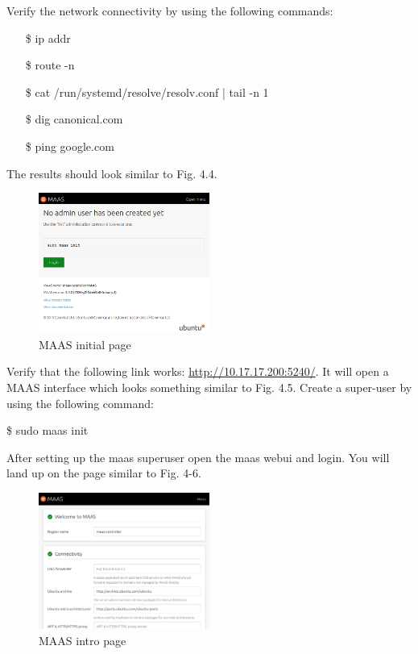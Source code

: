 Verify the network connectivity by using the following commands:

\begin{itemize}
    \setlength\itemsep{-1em}
    \item[\$] ip addr
    \item[\$] route -n
    \item[\$] cat /run/systemd/resolve/resolv.conf | tail -n 1 
    \item[\$] dig canonical.com
    \item[\$] ping google.com 
\end{itemize}

The results should look similar to Fig. 4.4.

\begin{figure}[!ht]
    \centering
    \includegraphics[width=0.5\textwidth]{images/4-5.png}
    \caption{MAAS initial page}
\end{figure}

Verify that the following link works: \url{http://10.17.17.200:5240/}. It will open a MAAS interface which looks something similar to Fig. 4.5. Create a super-user by using the following command: 

\$ sudo maas init

After setting up the maas superuser open the maas webui and login. You will land up on the page similar to Fig. 4-6.

\begin{figure}[!ht]
    \centering
    \includegraphics[width=0.5\textwidth]{images/4-6.png}
    \caption{MAAS intro page}
\end{figure}


